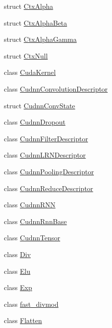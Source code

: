 \begin{DoxyCompactItemize}
\item 
struct \mbox{\hyperlink{structonnxruntime_1_1cuda_1_1CtxAlpha}{Ctx\+Alpha}}
\item 
struct \mbox{\hyperlink{structonnxruntime_1_1cuda_1_1CtxAlphaBeta}{Ctx\+Alpha\+Beta}}
\item 
struct \mbox{\hyperlink{structonnxruntime_1_1cuda_1_1CtxAlphaGamma}{Ctx\+Alpha\+Gamma}}
\item 
struct \mbox{\hyperlink{structonnxruntime_1_1cuda_1_1CtxNull}{Ctx\+Null}}
\item 
class \mbox{\hyperlink{classonnxruntime_1_1cuda_1_1CudaKernel}{Cuda\+Kernel}}
\item 
class \mbox{\hyperlink{classonnxruntime_1_1cuda_1_1CudnnConvolutionDescriptor}{Cudnn\+Convolution\+Descriptor}}
\item 
struct \mbox{\hyperlink{structonnxruntime_1_1cuda_1_1CudnnConvState}{Cudnn\+Conv\+State}}
\item 
class \mbox{\hyperlink{classonnxruntime_1_1cuda_1_1CudnnDropout}{Cudnn\+Dropout}}
\item 
class \mbox{\hyperlink{classonnxruntime_1_1cuda_1_1CudnnFilterDescriptor}{Cudnn\+Filter\+Descriptor}}
\item 
class \mbox{\hyperlink{classonnxruntime_1_1cuda_1_1CudnnLRNDescriptor}{Cudnn\+L\+R\+N\+Descriptor}}
\item 
class \mbox{\hyperlink{classonnxruntime_1_1cuda_1_1CudnnPoolingDescriptor}{Cudnn\+Pooling\+Descriptor}}
\item 
class \mbox{\hyperlink{classonnxruntime_1_1cuda_1_1CudnnReduceDescriptor}{Cudnn\+Reduce\+Descriptor}}
\item 
class \mbox{\hyperlink{classonnxruntime_1_1cuda_1_1CudnnRNN}{Cudnn\+R\+NN}}
\item 
class \mbox{\hyperlink{classonnxruntime_1_1cuda_1_1CudnnRnnBase}{Cudnn\+Rnn\+Base}}
\item 
class \mbox{\hyperlink{classonnxruntime_1_1cuda_1_1CudnnTensor}{Cudnn\+Tensor}}
\item 
class \mbox{\hyperlink{classonnxruntime_1_1cuda_1_1Div}{Div}}
\item 
class \mbox{\hyperlink{classonnxruntime_1_1cuda_1_1Elu}{Elu}}
\item 
class \mbox{\hyperlink{classonnxruntime_1_1cuda_1_1Exp}{Exp}}
\item 
class \mbox{\hyperlink{classonnxruntime_1_1cuda_1_1fast__divmod}{fast\+\_\+divmod}}
\item 
class \mbox{\hyperlink{classonnxruntime_1_1cuda_1_1Flatten}{Flatten}}

\end{DoxyCompactItemize}
